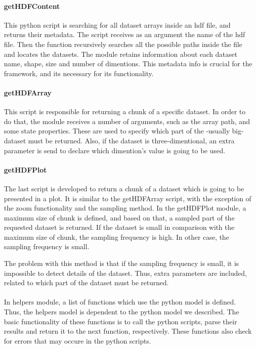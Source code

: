\paragraph{getHDFContent}
This python script is searching for all dataset arrays inside an hdf file, and returns their metadata. The script receives as an argument the name of the hdf file. Then the function recursively searches all the possible paths inside the file and locates the datasets. The module retains information about each dataset name, shape, size and number of dimentions. This metadata info is crucial for the framework, and its necessary for its functionality.

\paragraph{getHDFArray}
This script is responsible for returning a chunk of a specific dataset. In order to do that, the module receives a number of arguments, such as the array path, and some state properties. These are used to specify which part of the -usually big- dataset must be returned. Also, if the dataset is three-dimentional, an extra parameter is send to declare which dimention's value is going to be used.

\paragraph{getHDFPlot}
The last script is developed to return a chunk of a dataset which is going to be presented in a plot. It is similar to the getHDFArray script, with the exception of the zoom functionality and the sampling method. In the getHDFPlot module, a maximum size of chunk is defined, and based on that, a sampled part of the requested dataset is returned. If the dataset is small in comparison with the maximum size of chunk, the sampling frequency is high. In other case, the sampling frequency is small. \par 
	The problem with this method is that if the sampling frequency is small, it is impossible to detect details of the dataset. Thus, extra parameters are included, related to which part of the dataset must be returned.
	
\paragraph{}
In helpers module, a list of functions which use the python model is defined. Thus, the helpers model is dependent to the python model we described. The basic functionality of these functions is to call the python scripts, parse their results and return it to the next function, respectively. These functions also check for errors that may occure in the python scripts. 



